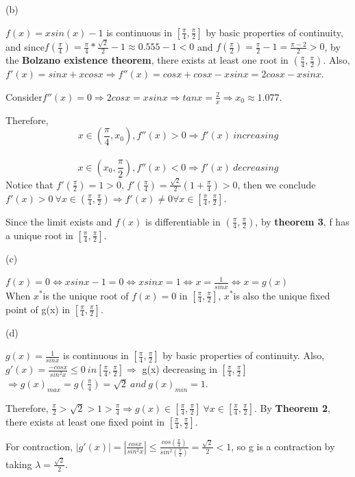 \documentclass[12pt]{article}
\begin{document}
(b)

$f(x)=xsin(x)-1$ is continuous in $[\frac{\pi}{4},\frac{\pi}{2}]$ by basic properties of continuity, and since$f(\frac{\pi}{4})=\frac{\pi}{4}*\frac{\sqrt{2}}{2}-1 \approx 0.555-1 <0$ and $f(\frac{\pi}{2})=\frac{\pi}{2}-1=\frac{\pi-2}{2}>0$, by the \textbf{Bolzano existence theorem}, there exists at least one root in $(\frac{\pi}{4},\frac{\pi}{2})$. Also, $f'(x) = sinx+xcosx \Rightarrow f''(x)=cosx+cosx-xsinx=2cosx-xsinx$.

Consider$f''(x)=0 \Rightarrow 2cosx=xsinx \Rightarrow tanx = \frac{2}{x} \Rightarrow x_0 \approx 1.077$. 

Therefore, $$x \in (\frac{\pi}{4},x_0), f''(x)>0 \Rightarrow f'(x) \ increasing$$\\ $$x \in (x_0, \frac{\pi}{2}), f''(x)<0 \Rightarrow f'(x) \ decreasing$$ Notice that $f'(\frac{\pi}{2})=1>0$, $f'(\frac{\pi}{4}) = \frac{\sqrt{2}}{2}(1+\frac{\pi}{4})>0$, then we conclude $f'(x)>0 \ \forall x \in (\frac{\pi}{4},\frac{\pi}{2}) \Rightarrow f'(x) \neq 0 \forall x \in [\frac{\pi}{4},\frac{\pi}{2}]$.

Since the limit exists and $f(x)$ is differentiable in $(\frac{\pi}{4},\frac{\pi}{2})$, by \textbf{theorem 3}, f has a unique root in $[\frac{\pi}{4},\frac{\pi}{2}]$.

(c)

$f(x)=0 \iff xsinx-1=0 \iff xsinx=1 \iff x=\frac{1}{sinx} \iff x = g(x)$\\
When $x^*$is the unique root of $f(x)=0$ in $[\frac{\pi}{4},\frac{\pi}{2}]$, $x^*$is also the unique fixed point of g(x) in $[\frac{\pi}{4},\frac{\pi}{2}]$.

(d)

$g(x)=\frac{1}{sinx}$ is continuous in $[\frac{\pi}{4},\frac{\pi}{2}]$ by basic properties of continuity. Also, $g'(x)=\frac{-cosx}{sin^2 x} \leq 0 \ in [\frac{\pi}{4},\frac{\pi}{2}] \Rightarrow$ g(x) decreasing in $[\frac{\pi}{4},\frac{\pi}{2}]$ $\Rightarrow g(x)_{max} = g(\frac{\pi}{4})=\sqrt{2} \ and \ g(x)_{min}=1$.

Therefore, $\frac{\pi}{2}>\sqrt{2}>1>\frac{\pi}{4}  \Rightarrow g(x) \in [\frac{\pi}{4},\frac{\pi}{2}] \ \forall x\in[\frac{\pi}{4},\frac{\pi}{2}]$. By \textbf{Theorem 2}, there exists at least one fixed point in $[\frac{\pi}{4},\frac{\pi}{2}]$.

For contraction, $|g'(x)|=|\frac{cosx}{sin^2 x}| \leq \frac{cos(\frac{\pi}{4})}{sin^2 (\frac{\pi}{2})}=\frac{\sqrt{2}}{2}<1$, so g is a contraction by taking $\lambda=\frac{\sqrt{2}}{2}$.
\end{document}
